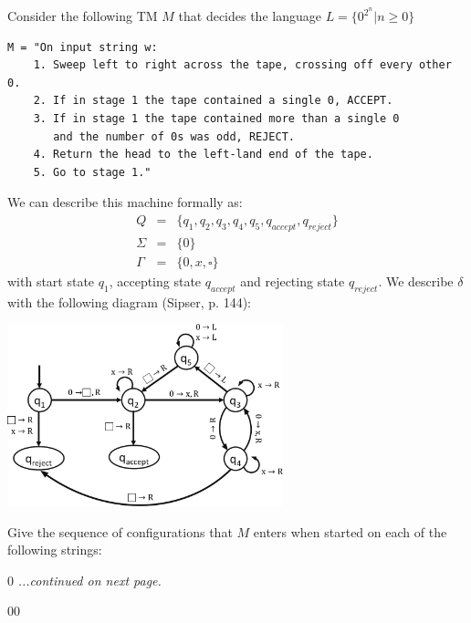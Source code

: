 \documentclass[12pt]{article}
\newenvironment{exercise}[2][Exercise]{\begin{trivlist}
\item[\hskip \labelsep {\bfseries #1}\hskip \labelsep {\bfseries #2.}]}{\end{trivlist}}
\newenvironment{solution}[1][{\color{red} Solution:}]{\begin{trivlist}
\item[\hskip \labelsep {\bfseries #1}\hskip \labelsep {\bfseries}]}{\end{trivlist}}
\begin{document}
\begin{exercise}{3}
Consider the following TM $M$ that decides the language $L = \{0^{2^n} | n \ge 0\}$
\footnotesize{\begin{verbatim}
M = "On input string w:
    1. Sweep left to right across the tape, crossing off every other 0.
    2. If in stage 1 the tape contained a single 0, ACCEPT.
    3. If in stage 1 the tape contained more than a single 0 
       and the number of 0s was odd, REJECT.
    4. Return the head to the left-land end of the tape.
    5. Go to stage 1."
\end{verbatim}}
We can describe this machine formally as:
\begin{eqnarray*}
Q &=& \{q_1, q_2, q_3, q_4, q_5, q_{accept}, q_{reject}\}\\
\Sigma &=& \{0\}\\
\Gamma &=& \{0,x,\square\}
\end{eqnarray*}
with start state $q_1$, accepting state $q_{accept}$ and rejecting state $q_{reject}$. We describe $\delta$ with the following diagram (Sipser, p. 144):
\begin{center}
\vspace{-1em}
\includegraphics[width=0.6\textwidth]{e2.png}
\end{center}
Give the sequence of configurations that $M$ enters when started on each of the following strings:
\begin{enumerate}[(a)]
	\setlength{\itemsep}{15em}
	\item 0
	\vfill\hfill\textit{...continued on next page.}
	\begin{solution}
	\end{solution}
	
	\item 00
	\begin{solution}
	\end{solution}
	

\end{enumerate}
\end{exercise}
\end{document}

